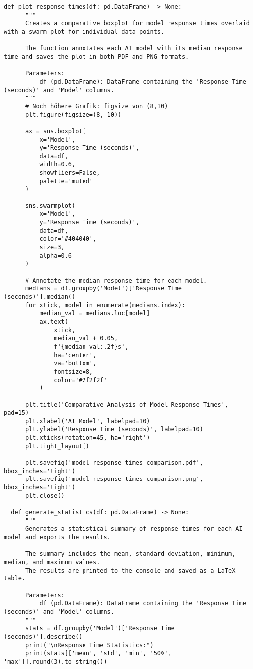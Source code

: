 \begin{lstlisting}[style=Python, caption={Python-quantitative-data-analysis}, captionpos=b]
  def plot_response_times(df: pd.DataFrame) -> None:
      """
      Creates a comparative boxplot for model response times overlaid with a swarm plot for individual data points.
      
      The function annotates each AI model with its median response time and saves the plot in both PDF and PNG formats.
      
      Parameters:
          df (pd.DataFrame): DataFrame containing the 'Response Time (seconds)' and 'Model' columns.
      """
      # Noch höhere Grafik: figsize von (8,10)
      plt.figure(figsize=(8, 10))
      
      ax = sns.boxplot(
          x='Model',
          y='Response Time (seconds)',
          data=df,
          width=0.6,
          showfliers=False,
          palette='muted'
      )
      
      sns.swarmplot(
          x='Model',
          y='Response Time (seconds)',
          data=df,
          color='#404040',
          size=3,
          alpha=0.6
      )
      
      # Annotate the median response time for each model.
      medians = df.groupby('Model')['Response Time (seconds)'].median()
      for xtick, model in enumerate(medians.index):
          median_val = medians.loc[model]
          ax.text(
              xtick,
              median_val + 0.05,
              f'{median_val:.2f}s',
              ha='center',
              va='bottom',
              fontsize=8,
              color='#2f2f2f'
          )
      
      plt.title('Comparative Analysis of Model Response Times', pad=15)
      plt.xlabel('AI Model', labelpad=10)
      plt.ylabel('Response Time (seconds)', labelpad=10)
      plt.xticks(rotation=45, ha='right')
      plt.tight_layout()
      
      plt.savefig('model_response_times_comparison.pdf', bbox_inches='tight')
      plt.savefig('model_response_times_comparison.png', bbox_inches='tight')
      plt.close()
  
  def generate_statistics(df: pd.DataFrame) -> None:
      """
      Generates a statistical summary of response times for each AI model and exports the results.
      
      The summary includes the mean, standard deviation, minimum, median, and maximum values.
      The results are printed to the console and saved as a LaTeX table.
      
      Parameters:
          df (pd.DataFrame): DataFrame containing the 'Response Time (seconds)' and 'Model' columns.
      """
      stats = df.groupby('Model')['Response Time (seconds)'].describe()
      print("\nResponse Time Statistics:")
      print(stats[['mean', 'std', 'min', '50%', 'max']].round(3).to_string())
      

\end{lstlisting}
